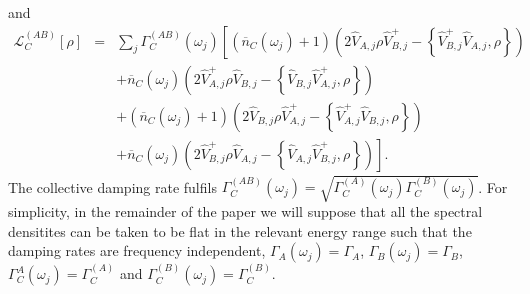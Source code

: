 \documentclass[12pt]{iopart}
\begin{document}
and
\begin{eqnarray}
\label{LCAB}
\mathcal{L}_{C}^{(AB)}[\rho] &=& \sum_{j} \Gamma_{C}^{(AB)}(\omega_{j})\left[ \left(\overline{n}_{C}(\omega_{j}) + 1\right)\left(2\hat{V}_{A,j}\rho \hat{V}_{B,j}^{+} - \left\{\hat{V}_{B,j}^{+}\hat{V}_{A,j},\rho\right\}\right) \right.\nonumber \\
&& + \overline{n}_{C}(\omega_{j})\left(2\hat{V}_{A,j}^{+}\rho \hat{V}_{B,j} - \left\{\hat{V}_{B,j}\hat{V}_{A,j}^{+},\rho\right\}\right) \nonumber \\
&& + \left(\overline{n}_{C}(\omega_{j}) + 1\right)\left(2\hat{V}_{B,j}\rho \hat{V}_{A,j}^{+} - \left\{\hat{V}_{A,j}^{+}\hat{V}_{B,j},\rho\right\}\right) \nonumber \\
&& \left.+ \overline{n}_{C}(\omega_{j})\left(2\hat{V}_{B,j}^{+}\rho \hat{V}_{A,j} - \left\{\hat{V}_{A,j}\hat{V}_{B,j}^{+},\rho\right\}\right)   \right] .
\end{eqnarray}
The collective damping rate fulfils $\Gamma_{C}^{(AB)}(\omega_{j})=\sqrt{\Gamma_{C}^{(A)}(\omega_{j})\Gamma_{C}^{(B)}(\omega_{j})}$.
For simplicity, in the remainder of the paper we will suppose that all the spectral densitites can be taken to be flat in the relevant energy range such that the damping rates are frequency independent, $\Gamma_{A}(\omega_{j})=\Gamma_{A}$, $\Gamma_{B}(\omega_{j})=\Gamma_{B}$, $\Gamma_{C}^{A}(\omega_{j})=\Gamma_{C}^{(A)}$ and $\Gamma_{C}^{(B)}(\omega_{j})=\Gamma_{C}^{(B)}$.
\end{document}
